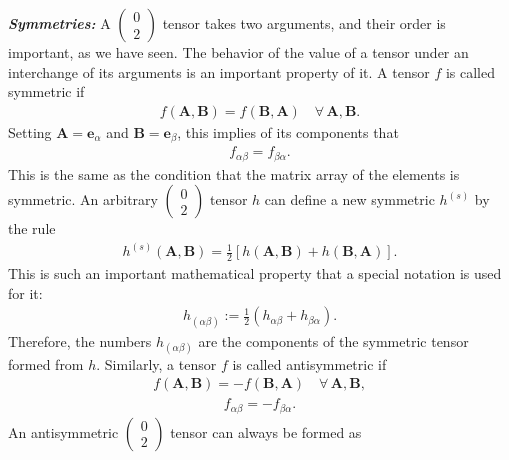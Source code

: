 \documentclass[11pt,letterpaper]{book}
\begin{document}
    \textit{\textbf{Symmetries:}} A \(\left(\begin{array}{c} 0 \\ 2 \end{array}\right)\) tensor takes two arguments, and their order is important, as we have seen. The behavior of the value of a tensor under an interchange of its arguments is an important property of it. A tensor \(f\) is called symmetric if
    \begin{align}
    f(\mathbf{A},\mathbf{B}) = f(\mathbf{B},\mathbf{A}) \quad \forall \, \mathbf{A}, \mathbf{B}. \tag{3.27}
    \end{align}
    Setting \(\mathbf{A} = \mathbf{e}_\alpha\) and \(\mathbf{B} = \mathbf{e}_\beta\), this implies of its components that
    \begin{align}
    f_{\alpha\beta} = f_{\beta\alpha}. \tag{3.28}
    \end{align}
    This is the same as the condition that the matrix array of the elements is symmetric. An arbitrary \(\left(\begin{array}{c} 0 \\ 2 \end{array}\right)\) tensor \(h\) can define a new symmetric \(h^{(s)}\) by the rule
    \begin{align}
    h^{(s)}(\mathbf{A},\mathbf{B}) = \frac{1}{2} \left[ h(\mathbf{A},\mathbf{B}) + h(\mathbf{B},\mathbf{A}) \right]. \tag{3.29}
    \end{align}
    This is such an important mathematical property that a special notation is used for it:
    \begin{align}
    h_{(\alpha\beta)} := \frac{1}{2} \left( h_{\alpha\beta} + h_{\beta\alpha} \right). \tag{3.31}
    \end{align}
    Therefore, the numbers \(h_{(\alpha\beta)}\) are the components of the symmetric tensor formed from \(h\).
    Similarly, a tensor \(f\) is called antisymmetric if
    \begin{align}
    f(\mathbf{A},\mathbf{B}) = -f(\mathbf{B},\mathbf{A}) \quad \forall \, \mathbf{A}, \mathbf{B}, \tag{3.32}
    \end{align}
    \begin{align}
    f_{\alpha\beta} = -f_{\beta\alpha}. \tag{3.33}
    \end{align}
    An antisymmetric \(\left(\begin{array}{c} 0 \\ 2 \end{array}\right)\) tensor can always be formed as
\end{document}
